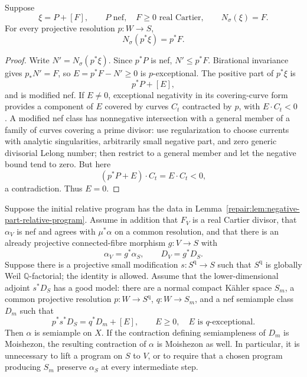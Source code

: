 \begin{lemma}
\label{repair:lem:negative-part-nef-pullback}
Suppose
\[
 \xi=P+[F],\qquad P\text{ nef},\quad F\geq0\text{ real Cartier},
 \qquad N_\sigma(\xi)=F.
\]
For every projective resolution $p:W\to S$,
\[
                         N_\sigma(p^*\xi)=p^*F.
\]
\end{lemma}

\begin{proof}
Write $N'=N_\sigma(p^*\xi)$. Since $p^*P$ is nef, $N'\leq p^*F$.
Birational invariance gives $p_*N'=F$, so
$E=p^*F-N'\geq0$ is $p$-exceptional. The positive part of $p^*\xi$ is
\[
                         p^*P+[E],
\]
and is modified nef. If $E\neq0$, exceptional negativity in its
covering-curve form provides a component of $E$ covered by curves $C_t$
contracted by $p$, with $E\cdot C_t<0$
\cite[Appendix~A, Lemma~A.3]{DHY2023}. A modified nef class has nonnegative
intersection with a general member of a family of curves covering a
prime divisor: use regularization to choose currents with analytic singularities,
arbitrarily small negative part, and zero generic divisorial Lelong number;
then restrict to a general member and let the negative bound tend to zero. But here
\[
                       (p^*P+E)\cdot C_t=E\cdot C_t<0,
\]
a contradiction. Thus $E=0$.
\end{proof}

\begin{proposition}
\label{repair:prop:negative-part-good-model}
Suppose the initial relative program has the data in
Lemma~\ref{repair:lem:negative-part-relative-program}. Assume in addition that $F_V$ is a real Cartier divisor, that
$\alpha_V$ is nef and agrees with $\mu^*\alpha$ on a common
resolution, and that there is an already projective connected-fibre
morphism $g:V\to S$ with
\[
\alpha_V=g^*\alpha_S,\qquad D_V=g^*D_S.
\]
Suppose there is a projective small modification
$s:S^{\mathrm q}\to S$ such that $S^{\mathrm q}$ is globally Weil
$\mathbb Q$-factorial; the identity is allowed. Assume that the
lower-dimensional adjoint $s^*D_S$ has a good model:
there are a normal compact K\"ahler space $S_m$, a common projective
resolution $p:W\to S^{\mathrm q}$, $q:W\to S_m$, and a nef semiample
class $D_m$ such that
\[
                  p^*s^*D_S=q^*D_m+[E],
 \qquad E\geq0,\quad E\text{ is }q\text{-exceptional}.
\]
Then $\alpha$ is semiample on $X$. If the contraction defining
semiampleness of $D_m$ is Moishezon, the resulting contraction of
$\alpha$ is Moishezon as well. In particular, it is unnecessary to
lift a program on $S$ to $V$, or to require that a chosen program
producing $S_m$ preserve $\alpha_S$ at every intermediate step.
\end{proposition}

